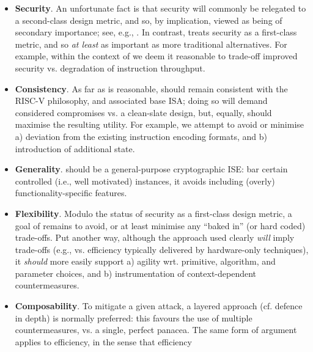 \begin{itemize}
      \begin{itemize}
      \item {\bf         Security}.
            An unfortunate fact is that security will commonly be relegated 
            to a second-class design metric, and so, by implication, viewed 
            as being of secondary importance;
            see, e.g., \cite{SCARV:Lee:03,SCARV:RKLMR:03,SCARV:RRKH:04,SCARV:BurMutTiw:16}.
            In contrast, \XCID treats security as a first-class metric, and
            so {\em at least} as important as more traditional alternatives.
            For example,
            within the context of \XCID we deem it reasonable to trade-off 
            improved security vs. degradation of instruction throughput.
      \item {\bf      Consistency}.
            As far as is reasonable, \XCID should remain consistent with the
            RISC-V philosophy, and associated base ISA; doing so will demand 
            considered compromises vs. a clean-slate design, but, equally,
            should maximise the resulting utility.
            For example,
            we attempt to avoid or minimise 
            a) deviation from the existing instruction encoding formats,
               and 
            b) introduction of additional state.
      \item {\bf       Generality}.
            \XCID should be a general-purpose cryptographic ISE: bar certain
            controlled (i.e., well motivated) instances, it avoids including 
            (overly) functionality-specific features.
      \item {\bf      Flexibility}. 
            Modulo the status of security as a first-class design metric, a
            goal of \XCID remains to avoid, or at least minimise any ``baked 
            in'' (or hard coded) trade-offs.  Put another way, although the 
            approach used clearly {\em will} imply trade-offs 
            (e.g., vs. efficiency typically delivered by hardware-only techniques), 
            it {\em should} more easily support
            a) agility wrt. primitive, algorithm, and parameter choices,
               and
            b) instrumentation of context-dependent countermeasures.
      \item {\bf    Composability}.
            To mitigate a given attack, a layered approach (cf. defence in 
            depth) is normally preferred: this favours the use of multiple
            countermeasures, vs. a single, perfect panacea.  The same form
            of argument applies to efficiency, in the sense that efficiency 

\end{itemize}
\end{itemize}
